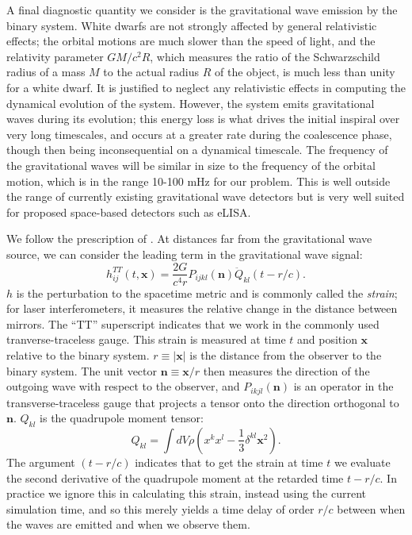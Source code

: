 \documentclass[iop]{../emulateapj}
\begin{document}
A final diagnostic quantity we consider is the gravitational wave emission by the 
binary system. White dwarfs are not strongly affected by general relativistic effects;
the orbital motions are much slower than the speed of light, and the relativity parameter 
$GM / c^2 R$, which measures the ratio of the Schwarzschild radius of a mass $M$ to the actual 
radius $R$ of the object, is much less than unity for a white dwarf. It is justified to 
neglect any relativistic effects in computing the dynamical evolution of the system. However,
the system emits gravitational waves during its evolution; this energy loss is what drives 
the initial inspiral over very long timescales, and occurs at a greater rate during 
the coalescence phase, though then being inconsequential on a dynamical timescale. The 
frequency of the gravitational waves will be similar in size to the frequency of the 
orbital motion, which is in the range 10-100 mHz for our problem. This is well outside 
the range of currently existing gravitational wave detectors but is very well suited 
for proposed space-based detectors such as eLISA.

We follow the prescription of \citet{blanchet:1990}. At distances far from the 
gravitational wave source, we can consider the leading term in the gravitational 
wave signal:
\begin{equation}
  h^{TT}_{ij}(t,\mathbf{x}) = \frac{2G}{c^4 r}P_{ijkl}(\mathbf{n}) \ddot{Q}_{kl}(t - r/c).
\end{equation}
$h$ is the perturbation to the spacetime metric and is commonly called the \textit{strain}; 
for laser interferometers, it measures the relative change in the distance between mirrors. 
The ``TT'' superscript indicates that we work in the commonly used tranverse-traceless gauge.
This strain is measured at time $t$ and position $\mathbf{x}$ relative to the binary system.
$r\equiv |\mathbf{x}|$ is the distance from the observer to the binary system. The unit vector 
$\mathbf{n} \equiv \mathbf{x} / r$ then measures the direction of the outgoing wave with 
respect to the observer, and $P_{ikjl}(\mathbf{n})$ is an operator in the transverse-traceless 
gauge that projects a tensor onto the direction orthogonal to $\mathbf{n}$. $Q_{kl}$ is the 
quadrupole moment tensor:
\begin{equation}
  Q_{kl} = \int dV \rho \left(x^k x^l - \frac{1}{3}\delta^{kl} \mathbf{x}^2\right).
\end{equation}
The argument $(t - r/c)$ indicates that to get the strain at time $t$ we evaluate the second derivative of the 
quadrupole moment at the retarded time $t - r/c$. In practice we ignore this in calculating this strain,
instead using the current simulation time, and so this merely yields a time delay of order $r/c$ between 
when the waves are emitted and when we observe them. 
\end{document}
